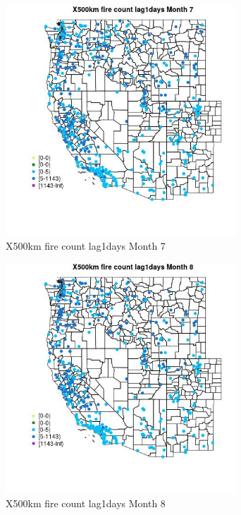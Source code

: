 \begin{figure} 
\centering  
\includegraphics[width=0.77\textwidth]{Code_Outputs/Report_ML_input_PM25_Step4_part_e_de_duplicated_aves_compiled_2019-05-14wNAs_MapObsMo7X500km_fire_count_lag1days.jpg} 
\caption{\label{fig:Report_ML_input_PM25_Step4_part_e_de_duplicated_aves_compiled_2019-05-14wNAsMapObsMo7X500km_fire_count_lag1days}X500km fire count lag1days Month 7} 
\end{figure} 
 

\begin{figure} 
\centering  
\includegraphics[width=0.77\textwidth]{Code_Outputs/Report_ML_input_PM25_Step4_part_e_de_duplicated_aves_compiled_2019-05-14wNAs_MapObsMo8X500km_fire_count_lag1days.jpg} 
\caption{\label{fig:Report_ML_input_PM25_Step4_part_e_de_duplicated_aves_compiled_2019-05-14wNAsMapObsMo8X500km_fire_count_lag1days}X500km fire count lag1days Month 8} 
\end{figure} 
 

